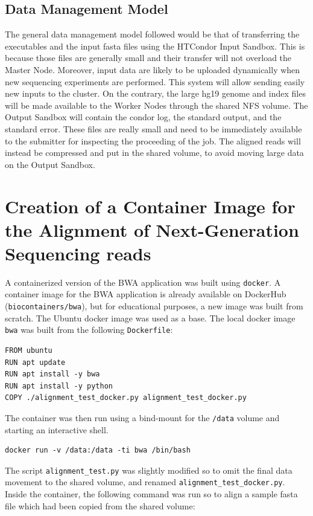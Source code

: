 \documentclass{article}
\begin{document}
\subsection{Data Management Model}
The general data management model followed would be that of transferring the executables and the input fasta files using the HTCondor Input Sandbox.
This is because those files are generally small and their transfer will not overload the Master Node.
Moreover, input data are likely to be uploaded dynamically when new sequencing experiments are performed.
This system will allow sending easily new inputs to the cluster.
On the contrary, the large hg19 genome and index files will be made available to the Worker Nodes through the shared NFS volume.
The Output Sandbox will contain the condor log, the standard output, and the standard error.
These files are really small and need to be immediately available to the submitter for inspecting the proceeding of the job.
The aligned reads will instead be compressed and put in the shared volume, to avoid moving large data on the Output Sandbox.

\section{Creation of a Container Image for the Alignment of Next-Generation Sequencing reads}
A containerized version of the BWA application was built using \texttt{docker}.
A container image for the BWA application is already available on DockerHub (\texttt{biocontainers/bwa}), but for educational purposes, a new image was built from scratch.
The Ubuntu docker image was used as a base.
The local docker image \texttt{bwa} was built from the following \texttt{Dockerfile}:

\begin{lstlisting}
FROM ubuntu
RUN apt update
RUN apt install -y bwa
RUN apt install -y python
COPY ./alignment_test_docker.py alignment_test_docker.py
\end{lstlisting}

The container was then run using a bind-mount for the \texttt{/data} volume and starting an interactive shell.

\begin{lstlisting}
docker run -v /data:/data -ti bwa /bin/bash
\end{lstlisting}

The script \texttt{alignment\_test.py} was slightly modified so to omit the final data movement to the shared volume, and renamed \texttt{alignment\_test\_docker.py}.
Inside the container, the following command was run so to align a sample fasta file which had been copied from the shared volume:
\end{document}
